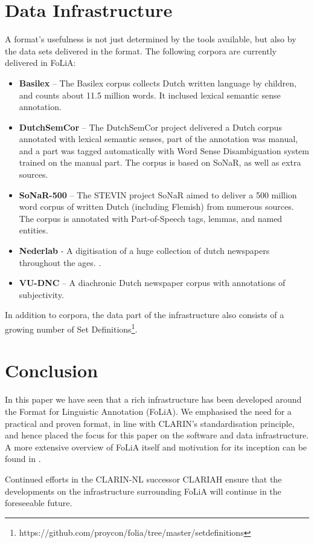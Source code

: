 \documentclass[a4paper,11pt]{article}
\begin{document}
\section{Data Infrastructure}
\label{sec:datainfrastructure}

A format's usefulness is not just determined by the tools
available, but also by the data sets delivered in the format.
The following corpora are currently delivered in FoLiA:

\begin{itemize}
    \item \textbf{Basilex} -- The Basilex corpus collects Dutch written language by children,
        and counts about 11.5 million words. It inclused lexical semantic sense
        annotation.\cite{BASILEX}
    \item \textbf{DutchSemCor} -- The DutchSemCor project delivered a Dutch corpus annotated
        with lexical semantic senses, part of the annotation was manual, and a
        part was tagged automatically with Word Sense Disambiguation system trained on
        the manual part. The corpus is based on SoNaR, as well as extra
        sources. \cite{DUTCHSEMCOR}
    \item \textbf{SoNaR-500} --  The STEVIN project SoNaR aimed to deliver a 500 million
        word corpus of written Dutch (including Flemish) from numerous sources.
        The corpus is annotated with Part-of-Speech tags, lemmas, and named
        entities. \cite{StevinSONAR2013}
    \item \textbf{Nederlab} - A digitisation of a huge collection of dutch
        newspapers throughout the ages. \cite{NEDERLAB}.
    \item \textbf{VU-DNC} -- A diachronic Dutch newspaper corpus with annotations of
        subjectivity.\cite{VUDNC}
\end{itemize}

In addition to corpora, the data part of the infrastructure also consists of a
growing number of Set
Definitions\footnote{https://github.com/proycon/folia/tree/master/setdefinitions}.

\section{Conclusion}
\label{sec:conclusion}

In this paper we have seen that a rich infrastructure has been developed around
the Format for Linguistic Annotation (FoLiA). We emphasised the need for a
practical and proven format, in line with CLARIN's standardisation principle,
and hence placed the focus for this paper on the software and data
infrastructure. A more extensive overview of FoLiA itself and motivation for its
inception can be found in \cite{FOLIACLIN2013}.

Continued efforts in the
CLARIN-NL successor CLARIAH ensure that the developments on the infrastructure
surrounding FoLiA will continue in the foreseeable future.


  
\end{document}
